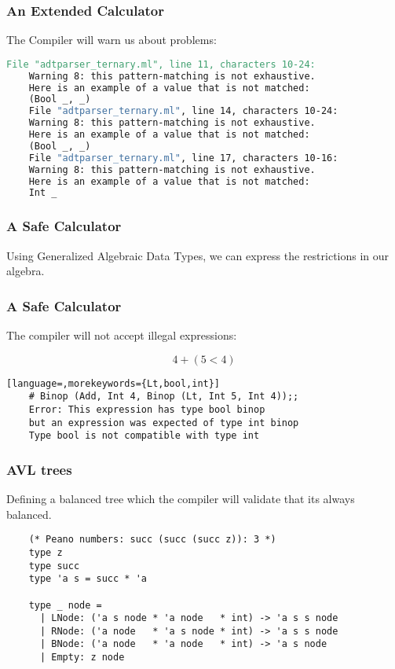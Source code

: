 \documentclass[xcolor=svgnames]{beamer}
\renewcommand{\_}{\mathunderscore}
\begin{document}
\begin{frame}[fragile]
  \frametitle{An Extended Calculator}
  The Compiler will warn us about problems:
  \begin{lstlisting}[basicstyle={\footnotesize\ttfamily},language=make]
    File "adtparser_ternary.ml", line 11, characters 10-24:
    Warning 8: this pattern-matching is not exhaustive.
    Here is an example of a value that is not matched:
    (Bool _, _)
    File "adtparser_ternary.ml", line 14, characters 10-24:
    Warning 8: this pattern-matching is not exhaustive.
    Here is an example of a value that is not matched:
    (Bool _, _)
    File "adtparser_ternary.ml", line 17, characters 10-16:
    Warning 8: this pattern-matching is not exhaustive.
    Here is an example of a value that is not matched:
    Int _
  \end{lstlisting}

\end{frame}

\begin{frame}[fragile]
  \frametitle{A Safe Calculator}
  Using Generalized Algebraic Data Types, we can express the
  restrictions in our algebra.

  
\end{frame}

\begin{frame}[fragile]
  \frametitle{A Safe Calculator}
  The compiler will not accept illegal expressions:

  \[4 + (5 < 4)\]

  \begin{lstlisting}[language=,morekeywords={Lt,bool,int}]
    # Binop (Add, Int 4, Binop (Lt, Int 5, Int 4));;
    Error: This expression has type bool binop
    but an expression was expected of type int binop
    Type bool is not compatible with type int
  \end{lstlisting}

\end{frame}

\begin{frame}[fragile]
  \frametitle{AVL trees}
  Defining a balanced tree which the compiler will validate that its
  always balanced.

  \begin{lstlisting}
    (* Peano numbers: succ (succ (succ z)): 3 *)
    type z
    type succ
    type 'a s = succ * 'a

    type _ node =
      | LNode: ('a s node * 'a node   * int) -> 'a s s node
      | RNode: ('a node   * 'a s node * int) -> 'a s s node
      | BNode: ('a node   * 'a node   * int) -> 'a s node
      | Empty: z node
  \end{lstlisting}

\end{frame}
\end{document}

